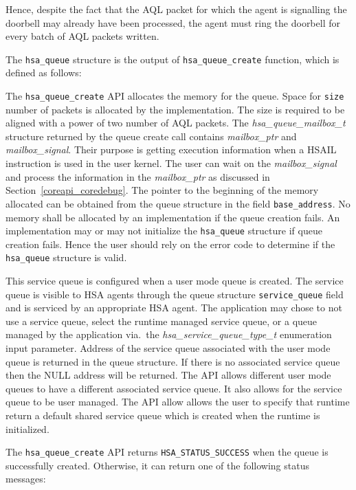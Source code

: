 Hence, despite the fact that the AQL packet for which the agent is
signalling the doorbell may already have been processed, the agent
must ring the doorbell for every batch of AQL packets written. 

The \texttt{hsa\_queue} structure is the output of
\texttt{hsa\_queue\_create} function, which is defined as
follows:



The \texttt{hsa\_queue\_create} API allocates the memory for the
queue. Space for \texttt{size} number of packets is allocated by the
implementation. The size is required to be aligned with a power of
two number of AQL packets. 
The {\itshape hsa\_queue\_mailbox\_t} structure returned by the
queue create call contains {\itshape mailbox\_ptr} and {\itshape
mailbox\_signal}. Their purpose is getting execution information
when a  
HSAIL instruction is used in the user kernel. The user can wait on
the {\itshape mailbox\_signal} and process the information in the
{\itshape mailbox\_ptr} as discussed in
Section~\ref{coreapi_coredebug}. 
The pointer to the beginning of the memory allocated can be obtained
from the queue structure in the field \texttt{base\_address}.  No
memory shall be allocated by an implementation if the queue creation
fails. An implementation may or may not initialize the
\texttt{hsa\_queue} structure if queue creation fails. Hence the
user should rely on the error code to determine if the
\texttt{hsa\_queue} structure is valid. 

This service queue is configured when a user mode queue is created.
The service queue is visible to HSA agents through the queue
structure \texttt{service\_queue} field and is serviced by an
appropriate HSA agent. The application may chose to not use a
service queue, select the runtime managed service queue, or a queue
managed by the application via.\ the {\itshape
hsa\_service\_queue\_type\_t} enumeration input parameter.  Address
of the service queue associated with the user mode queue is returned
in the queue structure. If there is no associated service queue then
the NULL address will be returned.  The API allows different user
mode queues to have a different associated service queue. It also
allows for the service queue to be user managed. The API allow
allows the user to specify that runtime return a default shared
service queue which is created when the runtime is initialized. 

The \texttt{hsa\_queue\_create} API returns
\texttt{HSA\_STATUS\_SUCCESS} when the queue is successfully
created.  Otherwise, it can return one of the following status
messages:

